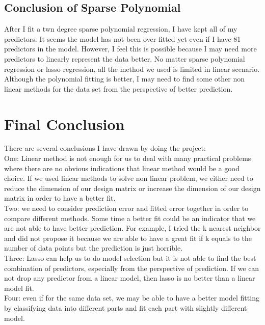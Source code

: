 \documentclass{article}\usepackage[]{graphicx}\usepackage[]{color}
\begin{document}
\subsection*{Conclusion of Sparse Polynomial}
After I fit a twn degree sparse polynomial regression, I have kept all of my predictors. It seems the model has not been over fitted yet even if I have 81 predictors in the model. However, I feel this is possible because I may need more predictors to linearly represent the data better. No matter sparse polynomial regression or lasso regression, all the method we used is limited in linear scenario. Although the polynomial fitting is better, I may need to find some other non linear methods for the data set from the perspective of better prediction.\\

\section*{Final Conclusion}
There are several conclusions I have drawn by doing the project:\\
One: Linear method is not enough for us to deal with many practical problems where there are no obvious indications that linear method would be a good choice. If we used linear methods to solve non linear problem, we either need to reduce the dimension of our design matrix or increase the dimension of our design matrix in order to have a better fit.\\
Two: we need to consider prediction error and fitted error together in order to compare different methods. Some time a better fit could be an indicator that we are not able to have better prediction. For example, I tried the k nearest neighbor and did not propose it because we are able to have a great fit if k equals to the number of data points but the prediction is just horrible. \\
Three: Lasso can help us to do model selection but it is not able to find the best combination of predictors, especially from the perspective of prediction. If we can not drop any predictor from a linear model, then lasso is no better than a linear model fit.\\
Four: even if for the same data set, we may be able to have a better model fitting by classifying data into different parts and fit each part with slightly different model.
\end{document}
